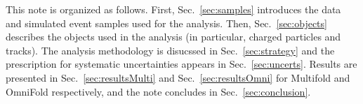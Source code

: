 This note is organized as follows.  First, Sec.~\ref{sec:samples} introduces the data and simulated event samples used for the analysis.  Then, Sec.~\ref{sec:objects} describes the objects used in the analysis (in particular, charged particles and tracks).  The analysis methodology is disucssed in Sec.~\ref{sec:strategy} and the prescription for systematic uncertainties appears in Sec.~\ref{sec:uncerts}.  Results are presented in Sec.~\ref{sec:resultsMulti} and Sec.~\ref{sec:resultsOmni} for Multifold and OmniFold respectively, and the note concludes in Sec.~\ref{sec:conclusion}.
